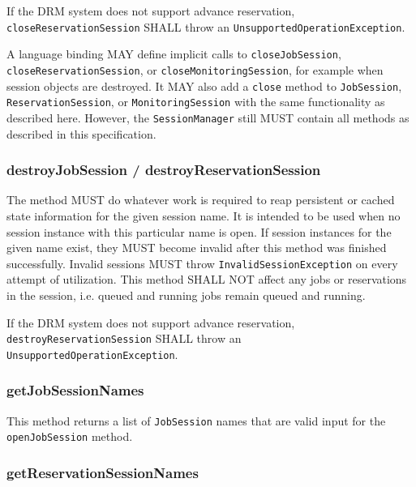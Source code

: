 \documentclass{article}
\newcommand{\h}[1]{\lstinline|#1|}
\newcommand{\langbind}[1]{\begin{shaded}#1\end{shaded}}
\newcommand{\rat}[1]{}
\begin{document}
If the DRM system does not support advance reservation, \h{closeReservationSession} SHALL throw an \h{UnsupportedOperationException}.

\langbind{
A language binding MAY define implicit calls to \h{closeJobSession}, \h{closeReservationSession}, or \h{closeMonitoringSession}, for example when session objects are destroyed. It MAY also add a \h{close} method to \h{JobSession},  \h{ReservationSession}, or \h{MonitoringSession} with the same functionality as described here. However, the \h{SessionManager} still MUST contain all methods as described in this specification.
}

\rat{Conf call June 29th 2011: The closing of stateless monitoring sessions was intentionally kept, in order to allow an orderly shut down of the monitoring connection.}

\subsubsection{destroyJobSession / destroyReservationSession}

The method MUST do whatever work is required to reap persistent or cached state information for the given session name. It is intended to be used when no session instance with this particular name is open. If session instances for the given name exist, they MUST become invalid after this method was finished successfully. Invalid sessions MUST throw \h{InvalidSessionException} on every attempt of utilization. This method SHALL NOT affect any jobs or reservations in the session, i.e. queued and running jobs remain queued and running. 

If the DRM system does not support advance reservation, \h{destroyReservationSession} SHALL throw an \h{UnsupportedOperationException}.

\subsubsection{getJobSessionNames}

This method returns a list of \h{JobSession} names that are valid input for the \h{openJobSession} method.

\rat{June 29th 2011 conf call decided to make the method names explicit enough to see the return type.}

\subsubsection{getReservationSessionNames}
\end{document}

